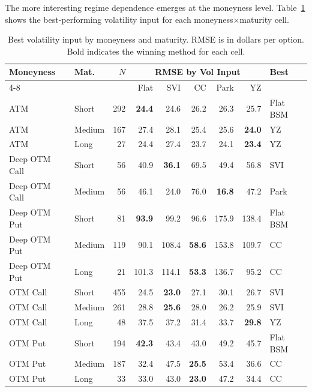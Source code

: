 \documentclass[12pt, letterpaper]{article}
\begin{document}
The more interesting regime dependence emerges at the moneyness level. Table~\ref{tab:best_vol} shows the best-performing volatility input for each moneyness$\times$maturity cell.

\begin{table}[H]
\centering
\caption{Best volatility input by moneyness and maturity. RMSE is in dollars per option. Bold indicates the winning method for each cell.}
\label{tab:best_vol}
\small
\begin{tabular}{llrrrrrrl}
\toprule
Moneyness & Mat. & $N$ & \multicolumn{5}{c}{RMSE by Vol Input} & Best \\
\cmidrule(lr){4-8}
          &      &     & Flat & SVI & CC & Park & YZ & \\
\midrule
ATM            & Short  & 292 & \textbf{24.4} & 24.6 & 26.2 & 26.3 & 25.7 & Flat BSM \\
ATM            & Medium & 167 & 27.4 & 28.1 & 25.4 & 25.6 & \textbf{24.0} & YZ \\
ATM            & Long   & 27  & 24.4 & 27.4 & 23.7 & 24.1 & \textbf{23.4} & YZ \\
Deep OTM Call  & Short  & 56  & 40.9 & \textbf{36.1} & 69.5 & 49.4 & 56.8 & SVI \\
Deep OTM Call  & Medium & 56  & 46.1 & 24.0 & 76.0 & \textbf{16.8} & 47.2 & Park \\
Deep OTM Put   & Short  & 81  & \textbf{93.9} & 99.2 & 96.6 & 175.9 & 138.4 & Flat BSM \\
Deep OTM Put   & Medium & 119 & 90.1 & 108.4 & \textbf{58.6} & 153.8 & 109.7 & CC \\
Deep OTM Put   & Long   & 21  & 101.3 & 114.1 & \textbf{53.3} & 136.7 & 95.2 & CC \\
OTM Call       & Short  & 455 & 24.5 & \textbf{23.0} & 27.1 & 30.1 & 26.7 & SVI \\
OTM Call       & Medium & 261 & 28.8 & \textbf{25.6} & 28.0 & 26.2 & 25.9 & SVI \\
OTM Call       & Long   & 48  & 37.5 & 37.2 & 31.4 & 33.7 & \textbf{29.8} & YZ \\
OTM Put        & Short  & 194 & \textbf{42.3} & 43.4 & 43.0 & 49.2 & 45.7 & Flat BSM \\
OTM Put        & Medium & 187 & 32.4 & 47.5 & \textbf{25.5} & 53.4 & 36.6 & CC \\
OTM Put        & Long   & 33  & 33.0 & 43.0 & \textbf{23.0} & 47.2 & 34.4 & CC \\
\bottomrule
\end{tabular}
\end{table}
\end{document}

